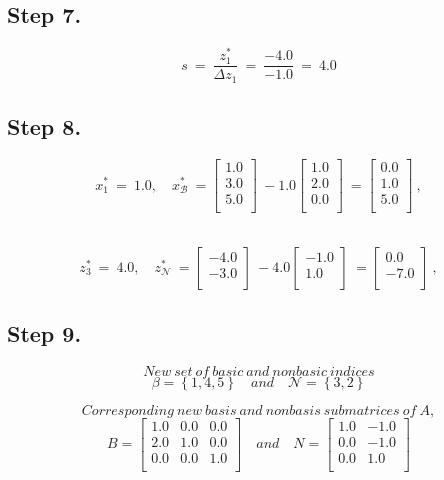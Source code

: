 \documentclass [12pt] {article}
\begin{document}
\subsection{Step 7.}
\[
s \ =\ \frac{z_{1}^{*}}{ \Delta z_{1}}\ =\ \frac{-4.0}{-1.0}\ =\ 4.0
\]
\subsection{Step 8.}
\[
x_{1}^{*}\ =\ 1.0, \quad x_{\mathcal B}^{*}\ =\begin{bmatrix}
1.0 \\ 3.0 \\ 5.0 \\ 
\end{bmatrix}\ -1.0\begin{bmatrix}
1.0 \\ 2.0 \\ 0.0 \\ 
\end{bmatrix}\ =\begin{bmatrix}
0.0 \\ 1.0 \\ 5.0 \\ 
\end{bmatrix}\ ,
\]
\

\[
z_{3}^{*}\ =\ 4.0, \quad z_{\mathcal N}^{*}\ =\begin{bmatrix}
-4.0 \\ -3.0 \\ 
\end{bmatrix}\ -4.0\begin{bmatrix}
-1.0 \\ 1.0 \\ 
\end{bmatrix}\ =\begin{bmatrix}
0.0 \\ -7.0 \\ 
\end{bmatrix}\ ,
\]
\subsection{Step 9.}

\[ New\ set\  of\  basic\  and\  nonbasic\  indices \]
\[
\beta= \left\{1, 4, 5\right\} \quad and \quad  \mathcal{N}=\left\{3, 2\right\}
\]

\[
Corresponding\ new\ basis\ and\ nonbasis\ submatrices\ of\ A,
\]
\[
B =
\begin{bmatrix}
1.0 & 0.0 & 0.0 \\ 2.0 & 1.0 & 0.0 \\ 0.0 & 0.0 & 1.0 \\ 
\end{bmatrix} \quad and \quad
\mathit{N} =
\begin{bmatrix}
1.0 & -1.0 \\ 0.0 & -1.0 \\ 0.0 & 1.0 \\ 
\end{bmatrix}
\]
\end{document}
